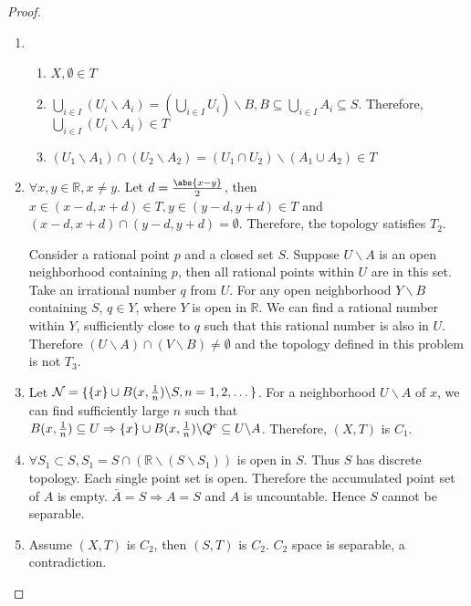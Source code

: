 \begin{solution}
\begin{proof}\mbox{}
\begin{enumerate}[label=(\alph*)]
\item 
\begin{enumerate}[label=(\roman*)]
\item $X,\emptyset \in T$

\item $\displaystyle\bigcup_{i\in I} (U_i \backslash A_i) = (\bigcup_{i\in I}U_i)\backslash B,B\subseteq \bigcup_{i\in I}A_i\subseteq S $. Therefore, $\displaystyle\bigcup_{i\in I} (U_i \backslash A_i)\in T$
\item $(U_1\backslash A_1)\cap (U_2\backslash A_2) = (U_1\cap U_2)\backslash (A_1\cup A_2) \in T$
\end{enumerate}
\item $\forall x,y \in \mathbb{R},x\neq y$. Let $d={\abs{x-y} \over 2}$, then $x\in (x-d,x+d)\in T,y\in (y-d,y+d)\in T$ and $(x-d,x+d)\cap (y-d,y+d)=\emptyset$. Therefore, the topology satisfies $T_2$. 

Consider a rational point $p$ and a closed set $S$. Suppose $U\backslash A$ is an open neighborhood containing $p$, then all rational points within $U$ are in this set. Take an irrational number $q$ from $U$. For any open neighborhood $Y\backslash B$ containing $S$, $q\in Y$, where $Y$ is open in $\mathbb{R}$.  We can find a rational number within $Y$, sufficiently close to $q$ such that this rational number is also in $U$. Therefore $(U\backslash A)\cap (V\backslash B) \neq \emptyset$ and the topology defined in this problem is not $T_3$.
\item Let $\mathcal{N} = \{ \{x\}\cup B(x,{1\over n})\backslash S,n=1,2,\dots\}$. For a neighborhood $ U\backslash A $ of $ x $, we can find sufficiently large $n$ such that $B(x,{1\over n})\subseteq U \Rightarrow \{x\} \cup B(x,{1\over n})\backslash Q^c \subseteq U\backslash A $. Therefore, $(X,T)$ is $C_1$.
\item $\forall S_1\subset S,S_1 = S\cap (\mathbb{R}\backslash(S\backslash S_1))$ is open  in $S$. Thus $S$ has discrete topology. Each single point set is open. Therefore the accumulated point set of $A$ is empty. $\bar{A}=S\Rightarrow A=S$ and $A$ is uncountable. Hence $S$ cannot be separable. 
\item Assume $(X,T)$ is $C_2$, then $(S,T)$ is $C_2$. $C_2$ space is separable, a contradiction. 
\end{enumerate}
\end{proof}
\end{solution}


